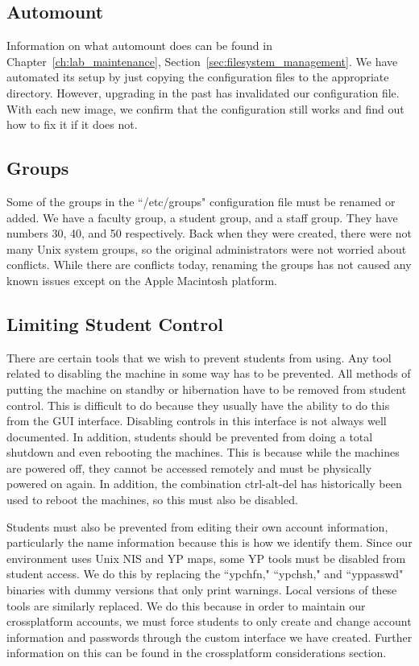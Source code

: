 \subsection{Automount}
Information on what automount does can be found in Chapter~\ref{ch:lab_maintenance}, Section~\ref{sec:filesystem_management}.  We have automated its setup by just copying the configuration files to the appropriate directory.  However, upgrading in the past has invalidated our configuration file.  With each new image, we confirm that the configuration still works and find out how to fix it if it does not. 

\subsection{Groups}
Some of the groups in the ``/etc/groups" configuration file must be renamed or added.  We have a faculty group, a student group, and a staff group.  They have numbers 30, 40, and 50 respectively.  Back when they were created, there were not many Unix system groups, so the original administrators were not worried about conflicts.  While there are conflicts today, renaming the groups has not caused any known issues except on the Apple Macintosh platform.  

\subsection{Limiting Student Control}
There are certain tools that we wish to prevent students from using.  Any tool related to disabling the machine in some way has to be prevented.  All methods of putting the machine on standby or hibernation have to be removed from student control.  This is difficult to do because they usually have the ability to do this from the GUI interface.  Disabling controls in this interface is not always well documented.  In addition, students should be prevented from doing a total shutdown and even rebooting the machines.  This is because while the machines are powered off, they cannot be accessed remotely and must be physically powered on again.  In addition, the combination ctrl-alt-del has historically been used to reboot the machines, so this must also be disabled.  

Students must also be prevented from editing their own account information, particularly the name information because this is how we identify them.  Since our environment uses Unix NIS and YP  maps, some YP tools must be disabled from student access.  We do this by replacing the ``ypchfn," ``ypchsh," and ``yppasswd" binaries with dummy versions that only print warnings.  Local versions of these tools are similarly replaced.  We do this because in order to maintain our crossplatform accounts, we must force students to only create and change account information and passwords through the custom interface we have created.  Further information on this can be found in the crossplatform considerations section.

